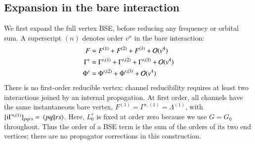 \documentclass[aip,jcp,reprint,noshowkeys,superscriptaddress]{revtex4-1}
\newcommand{\ii}{\mathrm{i}}
\begin{document}
\subsection{Expansion in the bare interaction}
\label{sec:perturbative_bse}

We first expand the full vertex BSE, before reducing any frequency or
orbital sum. A superscript $(n)$ denotes order $v^n$ in the bare interaction:
\begin{align}
    F&=F^{(1)}+F^{(2)}+F^{(3)}+\order*{v^4}
    \\
    \Gamma^r&=\Gamma^{r,(1)}+\Gamma^{r,(2)}
    +\Gamma^{r,(3)}+\order*{v^4}
    \\
    \Phi^r&=\Phi^{r,(2)}+\Phi^{r,(3)}+\order*{v^4}
    \label{eq:vertex_order_expansions}
\end{align}
There is no first-order reducible vertex: channel reducibility requires
at least two interactions joined by an internal propagation.
At first order, all channels have the same instantaneous bare vertex,
$F^{(1)}=\Gamma^{r,(1)}=\Lambda^{(1)}$, with
$[\ii\Gamma^{r,(1)}]_{pqrs}=\mel{pq}{}{rs}$.
Here, $L_0^r$ is fixed at order zero because we use $G=G_0$ throughout.
Thus the order of a BSE term is the sum of the orders of its two end
vertices; there are no propagator corrections in this construction.
\end{document}

